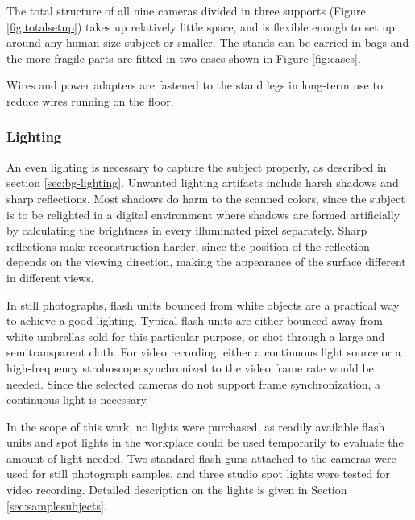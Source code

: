 The total structure of all nine cameras divided in three supports (Figure \ref{fig:totalsetup}) takes up relatively little space, and is flexible enough to set up around any human-size subject or smaller.
The stands can be carried in bags and the more fragile parts are fitted in two cases shown in Figure \ref{fig:cases}.

Wires and power adapters are fastened to the stand legs in long-term use to reduce wires running on the floor.




\subsubsection{Lighting}

An even lighting is necessary to capture the subject properly, as described in section \ref{sec:bg-lighting}.
Unwanted lighting artifacts include harsh shadows and sharp reflections.
Most shadows do harm to the scanned colors, since the subject is to be relighted in a digital environment where shadows are formed artificially by calculating the brightness in every illuminated pixel separately.
Sharp reflections make reconstruction harder, since the position of the reflection depends on the viewing direction, making the appearance of the surface different in different views.

In still photographs, flash units bounced from white objects are a practical way to achieve a good lighting.
Typical flash units are either bounced away from white umbrellas sold for this particular purpose, or shot through a large and semitransparent cloth.
For video recording, either a continuous light source or a high-frequency stroboscope synchronized to the video frame rate would be needed.
Since the selected cameras do not support frame synchronization, a continuous light is necessary.

In the scope of this work, no lights were purchased, as readily available flash units and spot lights in the workplace could be used temporarily to evaluate the amount of light needed.
Two standard flash guns attached to the cameras were used for still photograph samples, and three studio spot lights were tested for video recording.
Detailed description on the lights is given in Section \ref{sec:samplesubjects}.

